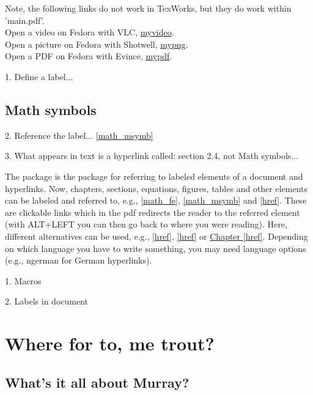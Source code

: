 Note, the following links do not work in TexWorks, but they do work within 'main.pdf'.\\
Open a video on Fedora with VLC, \href{run:attachments/video.mp4}{myvideo}.\\
Open a picture on Fedora with Shotwell, \href{run:attachments/texworks.png}{mypng}.\\
Open a PDF on Fedora with Evince, \href{file://attachments/sharp.pdf}{mypdf}.


1. Define a label...
\section{Math symbols} \label{math_msymb}

2. Reference the label...
\autoref{math_msymb} 

3. What appears in text is a hyperlink called: section 2.4, not Math symbols...

The package  is the package for referring to labeled elements of a document and hyperlinks. Now, chapters, sections, equations, figures, tables and other elements can be labeled and referred to, e.g., \autoref{math_fe}, \autoref{math_msymb} and \autoref{href}. These are clickable links which in the pdf redirects the reader to the referred element (with ALT+LEFT you can then go back to where you were reading). Here, different alternatives can be used, e.g., \ref{href}, \autoref{href} or \hyperref[href]{Chapter \ref*{href}}. Depending on which language you have to write something, you may need language options (e.g., ngerman for German hyperlinks).

1. Macros
\newcommand{\chapref}[1]{\autoref{#1}. \nameref{#1}}
\newcommand{\secref}[1]{\autoref{#1}. \nameref{#1}}

2. Labels in document
\chapter{Where for to, me trout?}
\label{ch:intro}
\section{What's it all about Murray?}
\label{sec:allabout}

